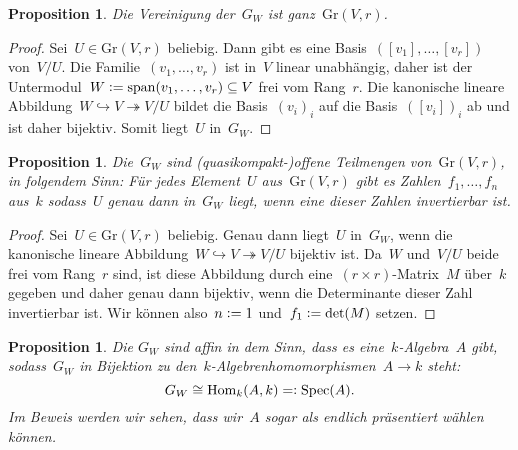 \documentclass[a4paper,ngerman,12pt]{scrartcl}
\theoremstyle{definition}
\theoremstyle{plain}
\newtheorem{prop}[defn]{Proposition}
\theoremstyle{remark}
\newcommand{\Hom}{\mathrm{Hom}}
\DeclareMathOperator{\Spec}{Spec}
\newcommand{\defeq}{\vcentcolon=}
\newcommand{\Gr}{\mathrm{Gr}}
\begin{document}
\begin{prop}Die Vereinigung der~$G_W$ ist ganz~$\Gr(V,r)$.\end{prop}

\begin{proof}Sei~$U \in \Gr(V,r)$ beliebig. Dann gibt es eine
Basis~$([v_1],\ldots,[v_r])$ von~$V/U$. Die Familie~$(v_1,\ldots,v_r)$ ist
in~$V$ linear unabhängig, daher ist der Untermodul~$W \defeq
\operatorname{span}(v_1,\ldots,v_r) \subseteq V$ frei vom Rang~$r$. Die
kanonische lineare Abbildung~$W \hookrightarrow V \twoheadrightarrow V/U$ bildet die
Basis~$(v_i)_i$ auf die Basis~$([v_i])_i$ ab und ist daher bijektiv. Somit
liegt~$U$ in~$G_W$.\end{proof}

\begin{prop}Die~$G_W$ sind (quasikompakt-)offene Teilmengen von~$\Gr(V,r)$, in
folgendem Sinn: Für jedes Element~$U$ aus~$\Gr(V,r)$ gibt es
Zahlen~$f_1,\ldots,f_n$ aus~$k$ sodass~$U$ genau dann in~$G_W$ liegt, wenn
eine dieser Zahlen invertierbar ist.
\end{prop}

\begin{proof}Sei~$U \in \Gr(V,r)$ beliebig. Genau dann liegt~$U$ in~$G_W$, wenn
die kanonische lineare Abbildung~$W \hookrightarrow V \twoheadrightarrow V/U$
bijektiv ist. Da~$W$ und~$V/U$ beide frei vom Rang~$r$ sind, ist diese
Abbildung durch eine~$(r \times r)$-Matrix~$M$ über~$k$ gegeben und daher genau
dann bijektiv, wenn die Determinante dieser Zahl invertierbar ist. Wir können
also~$n \defeq 1$ und~$f_1 \defeq \det(M)$ setzen.
\end{proof}

\begin{prop}Die $G_W$ sind affin in dem Sinn, dass es eine~$k$-Algebra~$A$ gibt,
sodass~$G_W$ in Bijektion zu den~$k$-Algebrenhomomorphismen~$A \to k$
steht:
\[ G_W \cong \Hom_k(A, k) =\vcentcolon \Spec(A). \]
Im Beweis werden wir sehen, dass wir~$A$ sogar als endlich präsentiert wählen
können.\end{prop}
\end{document}
